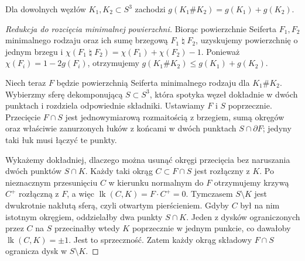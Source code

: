 \begin{twierdzenie}
Dla dowolnych węzłów $K_1,K_2\subset S^3$ zachodzi
$g(K_1\#K_2)=g(K_1)+g(K_2)$.
\end{twierdzenie}

\begin{proof}[Redukcja do rozcięcia minimalnej powierzchni]
Biorąc powierzchnie Seiferta $F_1,F_2$ minimalnego rodzaju
oraz ich sumę brzegową $F_1\mathbin{\natural}F_2$,
uzyskujemy powierzchnię o jednym brzegu i
$\chi(F_1\mathbin{\natural}F_2)=\chi(F_1)+\chi(F_2)-1$.
Ponieważ $\chi(F_i)=1-2g(F_i)$, otrzymujemy
$g(K_1\#K_2)\le g(K_1)+g(K_2)$.

Niech teraz $F$ będzie powierzchnią Seiferta minimalnego rodzaju
dla $K_1\#K_2$. Wybierzmy sferę dekomponującą
$S\subset S^3$, która spotyka węzeł dokładnie w dwóch
punktach i rozdziela odpowiednie składniki. Ustawiamy $F$
i $S$ poprzecznie. Przecięcie $F\cap S$ jest jednowymiarową rozmaitością z brzegiem, sumą
okręgów oraz właściwie zanurzonych łuków z końcami w dwóch
punktach $S\cap\partial F$; jedyny taki łuk musi łączyć
te punkty.

Wykażemy dokładniej, dlaczego można usunąć okręgi
przecięcia bez naruszania dwóch punktów $S\cap K$.
Każdy taki okrąg $C\subset F\cap S$ jest rozłączny z $K$.
Po nieznacznym przesunięciu $C$ w kierunku normalnym do
$F$ otrzymujemy krzywą $C^+$ rozłączną z $F$,
a więc $\operatorname{lk}(C,K)=F\cdot C^+=0$.
Tymczasem $S\setminus K$ jest dwukrotnie nakłutą sferą,
czyli otwartym pierścieniem. Gdyby $C$ był na nim
istotnym okręgiem, oddzielałby dwa punkty $S\cap K$.
Jeden z dysków ograniczonych przez $C$ na $S$
przecinałby wtedy $K$ poprzecznie w jednym punkcie,
co dawałoby $\operatorname{lk}(C,K)=\pm1$.
Jest to sprzeczność. Zatem każdy okrąg składowy
$F\cap S$ ogranicza dysk w $S\setminus K$.


\end{proof}
